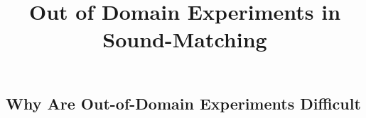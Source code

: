 \documentclass[12pt, oneside]{article} %
\title{Out of Domain Experiments in Sound-Matching}
\begin{document}
\maketitle

\subsection{Why Are Out-of-Domain Experiments Difficult}



\end{document}
